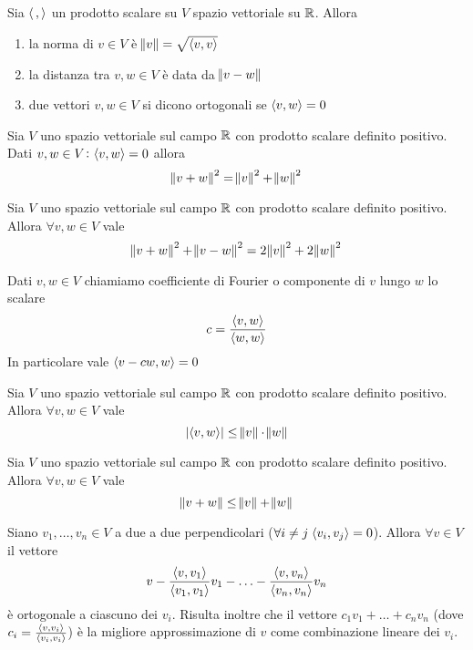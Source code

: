 \begin{definition}
	Sia $ \langle \,,  \rangle $ un prodotto scalare su $ V $ spazio vettoriale su $ \mathbb{R} $. Allora
	\begin{enumerate}
		\item la norma di $ v \in V $ è $ \norm{v} = \sqrt{\langle v, v \rangle} $
		\item la distanza tra $ v, w \in V $ è data da $ \norm{v - w} $
		\item due vettori $ v, w \in V $ si dicono ortogonali se $ \langle v, w \rangle = 0 $
	\end{enumerate}
\end{definition}

\begin{thm}[di Pitagora]
	Sia $ V $ uno spazio vettoriale sul campo $ \mathbb{R} $ con prodotto scalare definito positivo. Dati $ v, w \in V \colon \langle v, w \rangle = 0 $	allora \[\norm{v + w}^2 = \norm{v}^2 + \norm{w}^2\]
\end{thm}

\begin{thm}
	Sia $ V $ uno spazio vettoriale sul campo $ \mathbb{R} $ con prodotto scalare definito positivo. Allora $ \forall v, w \in V $ vale \[\norm{v + w}^2 + \norm{v - w}^2 = 2\norm{v}^2 + 2\norm{w}^2\]
\end{thm}

\begin{definition}[componente]
	Dati $ v, w \in V $ chiamiamo coefficiente di Fourier o componente di $ v $ lungo $ w $ lo scalare \[c = \frac{\langle v, w \rangle}{\langle w, w \rangle}\] In particolare vale $ \langle v - cw, w \rangle = 0 $
\end{definition}

\begin{thm}
	Sia $ V $ uno spazio vettoriale sul campo $ \mathbb{R} $ con prodotto scalare definito positivo. Allora $ \forall v, w \in V $ vale \[|\langle v, w \rangle| \leq \norm{v} \cdot \norm{w}\]
\end{thm}

\begin{thm}
	Sia $ V $ uno spazio vettoriale sul campo $ \mathbb{R} $ con prodotto scalare definito positivo. Allora $ \forall v, w \in V $ vale \[\norm{v + w} \leq \norm{v} + \norm{w}\]
\end{thm}

\begin{thm}
	Siano $ v_1, \ldots , v_n \in V $ a due a due perpendicolari ($ \forall i \neq j \; \langle v_i, v_j \rangle = 0 $). Allora $ \forall v \in V $ il vettore \[v - \frac{\langle v, v_1 \rangle}{\langle v_1, v_1 \rangle}v_1 - \ldots - \frac{\langle v, v_n \rangle}{\langle v_n, v_n \rangle}v_n\] è ortogonale a ciascuno dei $ v_i $. Risulta inoltre che il vettore $ c_1 v_1 + \ldots + c_n v_n $ (dove $ c_i = \frac{\langle v, v_i \rangle}{\langle v_i, v_i \rangle} $) è la migliore approssimazione di $ v $ come combinazione lineare dei $ v_i $.
\end{thm}

